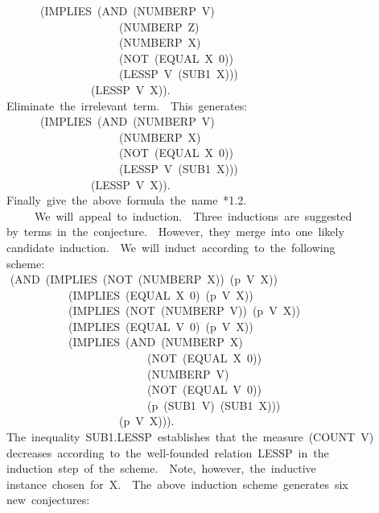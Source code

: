 \documentclass[10pt]{book}
\newenvironment{pubasis}{\begin{flushleft}}{\end{flushleft}}
\begin{document}
\begin{pubasis}
~~~~~~~~(IMPLIES~(AND~(NUMBERP~V)\\
~~~~~~~~~~~~~~~~~~~~~~(NUMBERP~Z)\\
~~~~~~~~~~~~~~~~~~~~~~(NUMBERP~X)\\
~~~~~~~~~~~~~~~~~~~~~~(NOT~(EQUAL~X~0))\\
~~~~~~~~~~~~~~~~~~~~~~(LESSP~V~(SUB1~X)))\\
~~~~~~~~~~~~~~~~~(LESSP~V~X)).\\

~~Eliminate~the~irrelevant~term.~~This~generates:\\

~~~~~~~~(IMPLIES~(AND~(NUMBERP~V)\\
~~~~~~~~~~~~~~~~~~~~~~(NUMBERP~X)\\
~~~~~~~~~~~~~~~~~~~~~~(NOT~(EQUAL~X~0))\\
~~~~~~~~~~~~~~~~~~~~~~(LESSP~V~(SUB1~X)))\\
~~~~~~~~~~~~~~~~~(LESSP~V~X)).\\

~~Finally~give~the~above~formula~the~name~*1.2.\\

~~~~~~~We~will~appeal~to~induction.~~Three~inductions~are~suggested\\
~~by~terms~in~the~conjecture.~~However,~they~merge~into~one~likely\\
~~candidate~induction.~~We~will~induct~according~to~the~following\\
~~scheme:\\
~~	(AND~(IMPLIES~(NOT~(NUMBERP~X))~(p~V~X))\\
~~~~~~~~~~~~~(IMPLIES~(EQUAL~X~0)~(p~V~X))\\
~~~~~~~~~~~~~(IMPLIES~(NOT~(NUMBERP~V))~(p~V~X))\\
~~~~~~~~~~~~~(IMPLIES~(EQUAL~V~0)~(p~V~X))\\
~~~~~~~~~~~~~(IMPLIES~(AND~(NUMBERP~X)\\
~~~~~~~~~~~~~~~~~~~~~~~~~~~(NOT~(EQUAL~X~0))\\
~~~~~~~~~~~~~~~~~~~~~~~~~~~(NUMBERP~V)\\
~~~~~~~~~~~~~~~~~~~~~~~~~~~(NOT~(EQUAL~V~0))\\
~~~~~~~~~~~~~~~~~~~~~~~~~~~(p~(SUB1~V)~(SUB1~X)))\\
~~~~~~~~~~~~~~~~~~~~~~(p~V~X))).\\
~~The~inequality~SUB1.LESSP~establishes~that~the~measure~(COUNT~V)\\
~~decreases~according~to~the~well-founded~relation~LESSP~in~the\\
~~induction~step~of~the~scheme.~~Note,~however,~the~inductive\\
~~instance~chosen~for~X.~~The~above~induction~scheme~generates~six\\
~~new~conjectures:\\


\end{pubasis}
\end{document}

